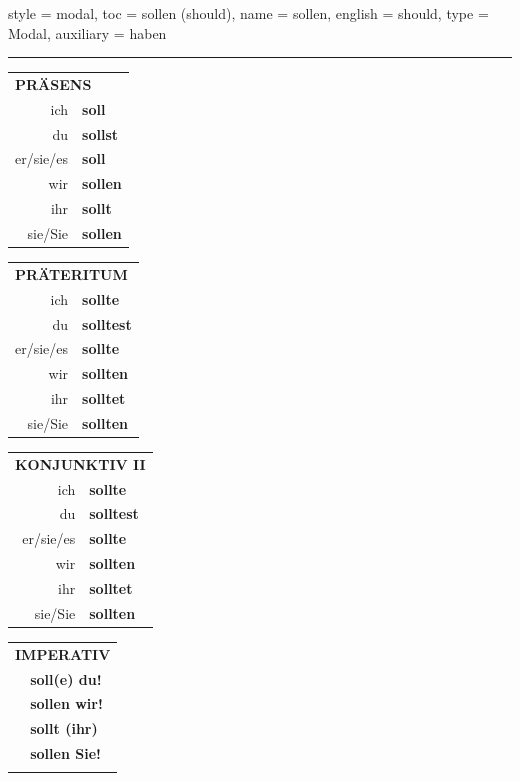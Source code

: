 \begin{verbentry}{
  style = {modal},
  toc = {sollen (should)},
  name = {sollen},
  english = {should},
  type = {Modal},
  auxiliary = {haben}
}
 
     \vspace{5pt}
    \hrule
    \vspace{5pt}
  \begin{tabular}{rl}
     \multicolumn{2}{l}{\textbf{PRÄSENS} }\\
    ich & \textbf{soll}\\
    du & \textbf{sollst}\\
    er/sie/es & \textbf{soll}\\
    wir & \textbf{sollen}\\
    ihr & \textbf{sollt}\\
    sie/Sie & \textbf{sollen}\\
  \end{tabular}
  \hfill
     \begin{tabular}{rl}
    \multicolumn{2}{l}{\textbf{PRÄTERITUM} }\\
    ich & \textbf{sollte}\\
    du & \textbf{solltest}\\
    er/sie/es & \textbf{sollte}\\
    wir & \textbf{sollten}\\
    ihr & \textbf{solltet}\\
    sie/Sie & \textbf{sollten}\\
  \end{tabular}
   \hfill
     \begin{tabular}{rl}
    \multicolumn{2}{l}{\textbf{KONJUNKTIV II} }\\
    ich & \textbf{sollte}\\
    du & \textbf{solltest}\\
    er/sie/es & \textbf{sollte}\\
    wir & \textbf{sollten}\\
    ihr & \textbf{solltet}\\
    sie/Sie & \textbf{sollten}\\
  \end{tabular}
  \hfill
  \begin{tabular}{rl}
     \multicolumn{2}{l}{\textbf{IMPERATIV} }\\
   & \textbf{soll(e) du!}\\
   & \textbf{sollen wir!}\\
   & \textbf{sollt (ihr)}\\
   & \textbf{sollen Sie!}\\
   & \vspace{10pt}
  \end{tabular}


\end{verbentry}
